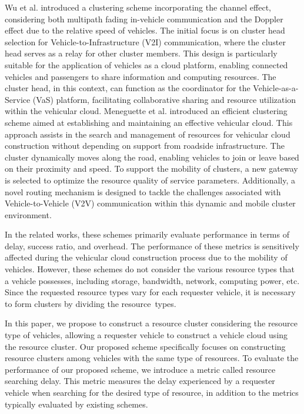 \documentclass[sensors,article,accept,moreauthors,pdftex]{Definitions/mdpi}
\begin{document}
Wu et al. \cite{Wu2019} introduced a clustering scheme incorporating the channel effect, considering both multipath fading in-vehicle communication and the Doppler effect due to the relative speed of vehicles. The initial focus is on cluster head selection for Vehicle-to-Infrastructure (V2I) communication, where the cluster head serves as a relay for other cluster members. This design is particularly suitable for the application of vehicles as a cloud platform, enabling connected vehicles and passengers to share information and computing resources. The cluster head, in this context, can function as the coordinator for the Vehicle-as-a-Service (VaS) platform, facilitating collaborative sharing and resource utilization within the vehicular cloud.
Meneguette et al. \cite{Meneguette2017a} introduced an efficient clustering scheme aimed at establishing and maintaining an effective vehicular cloud. This approach assists in the search and management of resources for vehicular cloud construction without depending on support from roadside infrastructure. The cluster dynamically moves along the road, enabling vehicles to join or leave based on their proximity and speed. To support the mobility of clusters, a new gateway is selected to optimize the resource quality of service parameters. Additionally, a novel routing mechanism is designed to tackle the challenges associated with Vehicle-to-Vehicle (V2V) communication within this dynamic and mobile cluster environment.

In the related works, these schemes primarily evaluate performance in terms of delay, success ratio, and overhead. The performance of these metrics is sensitively affected during the vehicular cloud construction process due to the mobility of vehicles. However, these schemes do not consider the various resource types that a vehicle possesses, including storage, bandwidth, network, computing power, etc. Since the requested resource types vary for each requester vehicle, it is necessary to form clusters by dividing the resource~types.

In this paper, we propose to construct a resource cluster considering the resource type of vehicles, allowing a requester vehicle to construct a vehicle cloud using the resource cluster. Our proposed scheme specifically focuses on constructing resource clusters among vehicles with the same type of resources. To evaluate the performance of our proposed scheme, we introduce a metric called resource searching delay. This metric measures the delay experienced by a requester vehicle when searching for the desired type of resource, in addition to the metrics typically evaluated by existing schemes.
\end{document}
